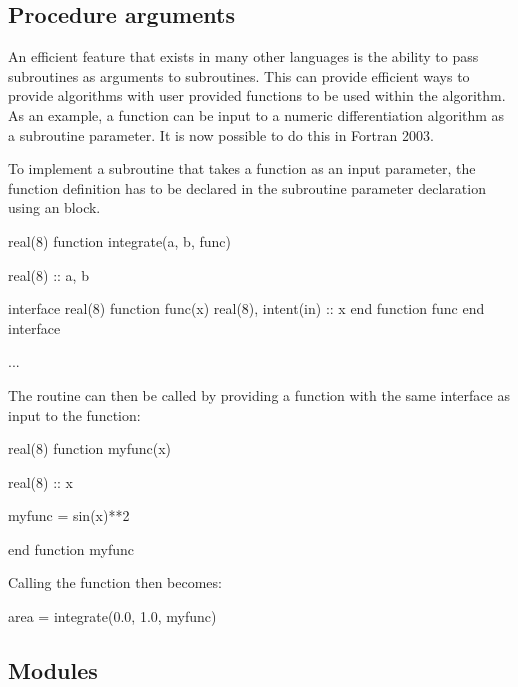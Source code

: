 \subsection{Procedure arguments}

An efficient feature that exists in many other languages is the ability to pass subroutines as arguments to subroutines. This can provide efficient ways to provide algorithms with user provided functions to be used within the algorithm. As an example, a function can be input to a numeric differentiation algorithm as a subroutine parameter. It is now possible to do this in Fortran 2003.

To implement a subroutine that takes a function as an input parameter, the function definition has to be declared in the subroutine parameter declaration using an  block.

\begin{fortrancodeenv}
real(8) function integrate(a, b, func)

	real(8) :: a, b
	
	interface
		real(8) function func(x)
			real(8), intent(in) :: x
		end function func
	end interface
	
	...
\end{fortrancodeenv}

The routine can then be called by providing a function with the same interface as input to the function:

\begin{fortrancodeenv}
real(8) function myfunc(x)
	
	real(8) :: x
	
	myfunc = sin(x)**2
	
end function myfunc
\end{fortrancodeenv}

Calling the  function then becomes:

\begin{fortrancodeenv}
area = integrate(0.0, 1.0, myfunc)
\end{fortrancodeenv}



\subsection{Modules}

